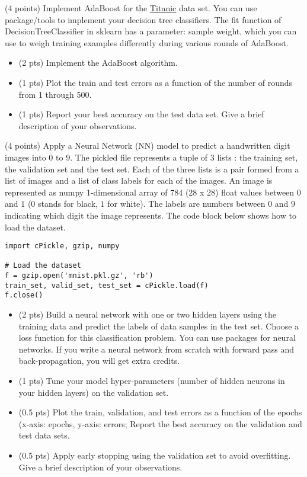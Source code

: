 \documentclass{exam}
\begin{document}
\begin{questions}
\newpage
{} (4 points) Implement AdaBoost for the \href{https://www.kaggle.com/c/titanic/data}{Titanic} data set. You can use package/tools to implement your decision tree classifiers. The fit function of DecisionTreeClassifier in sklearn has a parameter: sample weight, which you can use to weigh training examples differently during various
rounds of AdaBoost. 
\begin{itemize}
\item (2 pts) Implement the AdaBoost algorithm.
\item (1 pts) Plot the train and test errors as a function of the number of rounds from 1 through 500. 
\item (1 pts) Report your best accuracy on the test data set. Give a brief description of your observations.
\end{itemize}

 \newpage
  (4 points)  Apply a Neural Network (NN) model to predict a handwritten digit images into $0$ to $9$.  The pickled file represents a tuple of 3 lists : the training set, the validation set and the test set. Each of the three lists is a pair formed from a list of images and a list of class labels for each of the images. An image is represented as numpy 1-dimensional array of 784 (28 x 28) float values between $0$ and $1$ ($0$ stands for black, $1$ for white). The labels are numbers between $0$ and $9$ indicating which digit the image represents. The code block below shows how to load the dataset.
 
 \begin{lstlisting}
import cPickle, gzip, numpy

# Load the dataset
f = gzip.open('mnist.pkl.gz', 'rb')
train_set, valid_set, test_set = cPickle.load(f)
f.close()
\end{lstlisting}

\begin{itemize}
\item (2 pts) Build a neural network with one or two hidden layers using the training data and predict the labels of data samples in the test set. Choose a loss function for this classification problem. You can use packages for neural networks. If you write a neural network from scratch with forward pass and back-propagation, you will get extra credits.
\item (1 pts) Tune your model hyper-parameters (number of hidden neurons in your hidden layers) on the validation set.
\item (0.5 pts) Plot the train, validation, and test errors as a function of the epochs (x-axis: epochs, y-axis: errors; Report the best accuracy on the validation and test data sets.
\item (0.5 pts) Apply early stopping using the validation set to avoid overfitting. Give a brief description of your observations.
\end{itemize}
\end{questions}
\end{document}
